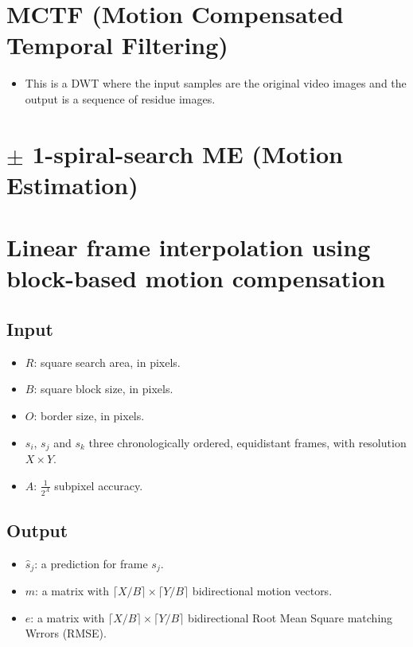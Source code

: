 {

\section{MCTF (Motion Compensated Temporal Filtering)}
\begin{itemize}
\tightlist
\item
  This is a DWT where the input samples are the original video images
  and the output is a sequence of residue images.
\end{itemize}


\section{$\pm$ 1-spiral-search ME (Motion Estimation)}

\section{Linear frame interpolation using block-based motion compensation}
\label{sec:linear_frame_interpolation}

\subsection{Input}
\begin{itemize}
\tightlist
\item
  $R$: square search area, in pixels.
\item
  $B$: square block size, in pixels.
\item
  $O$: border size, in pixels.
\item
  $s_i$, $s_j$ and $s_k$ three chronologically ordered,
  equidistant frames, with resolution $X\times Y$.
\item
  $A$: $\frac{1}{2^A}$ subpixel accuracy.
\end{itemize}

\subsection{Output}
\begin{itemize}
\tightlist
\item
  $\hat{s}_j$: a prediction for frame $s_j$.
\item
  $m$: a matrix with $\lceil X/B\rceil \times \lceil Y/B\rceil$
  bidirectional motion vectors.
\item
  $e$: a matrix with $\lceil X/B\rceil \times \lceil Y/B\rceil$
  bidirectional Root Mean Square matching Wrrors (RMSE).
\end{itemize}

}
